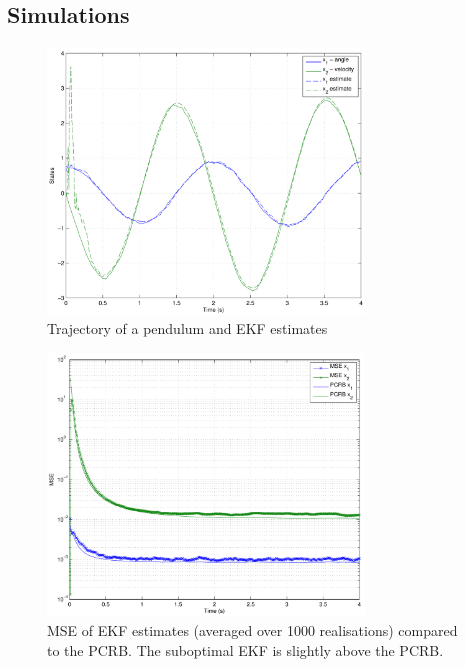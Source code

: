 \documentclass{article}
\begin{document}
\subsection{Simulations}

\begin{figure}[H]
	\centering
	\includegraphics[width=0.75\textwidth]{../figures/pendulum_trajectory}
	\caption{Trajectory of a pendulum and EKF estimates}
\end{figure}
\begin{figure}[H]
	\centering
	\includegraphics[width=0.75\textwidth]{../figures/pendulum_pcrb}
	\caption{MSE of EKF estimates (averaged over 1000 realisations) compared to the PCRB. The suboptimal EKF is slightly above the PCRB.}
\end{figure}

\small


% 
\end{document}

